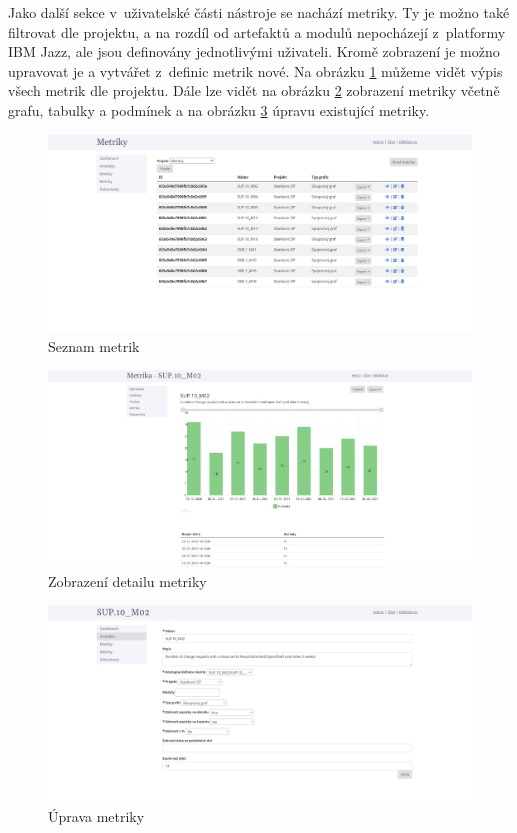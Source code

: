 \documentclass[czech,master]{diploma}
\begin{document}
Jako další sekce v~uživatelské části nástroje se nachází metriky. Ty je možno také filtrovat dle projektu, a na rozdíl od artefaktů a modulů nepocházejí z~platformy IBM Jazz, ale jsou definovány jednotlivými uživateli. Kromě zobrazení je možno upravovat je a vytvářet z~definic metrik nové. Na obrázku \ref{fig:metrics_tool_metrics} můžeme vidět výpis všech metrik dle projektu. Dále lze vidět na obrázku \ref{fig:metrics_tool_metrics_detail} zobrazení metriky včetně grafu, tabulky a podmínek a na obrázku \ref{fig:metrics_tool_metrics_edit} úpravu existující metriky.

\begin{figure}[!ht]
    \centering
    \includegraphics[width=1\textwidth]{Diplomka/Figures/metrics_tool/metrics.jpg}
    \caption{Seznam metrik}
    \label{fig:metrics_tool_metrics}
\end{figure}

\begin{figure}[!ht]
    \centering
    \includegraphics[width=1\textwidth]{Diplomka/Figures/metrics_tool/metrics_detail.jpg}
    \caption{Zobrazení detailu metriky}
    \label{fig:metrics_tool_metrics_detail}
\end{figure}


\begin{figure}[!ht]
    \centering
    \includegraphics[width=1\textwidth]{Diplomka/Figures/metrics_tool/metrics_edit.jpg}
    \caption{Úprava metriky}
    \label{fig:metrics_tool_metrics_edit}
\end{figure}
\end{document}
